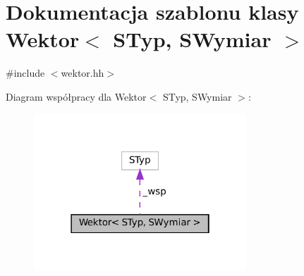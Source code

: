 \hypertarget{class_wektor}{}\section{Dokumentacja szablonu klasy Wektor$<$ S\+Typ, S\+Wymiar $>$}
\label{class_wektor}


{\ttfamily \#include $<$wektor.\+hh$>$}



Diagram współpracy dla Wektor$<$ S\+Typ, S\+Wymiar $>$\+:\nopagebreak
\begin{figure}[H]
\begin{center}
\leavevmode
\includegraphics[width=226pt]{class_wektor__coll__graph}
\end{center}
\end{figure}
